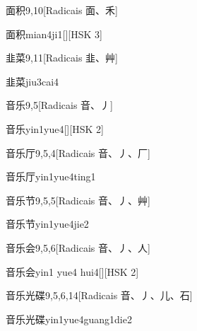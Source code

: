 \begin{entry}{面积}{9,10}[Radicais ⾯、⽲]
  \begin{phonetics}{面积}{mian4ji1}[][HSK 3]
  \end{phonetics}
\end{entry}

\begin{entry}{韭菜}{9,11}[Radicais ⾲、⾋]
  \begin{phonetics}{韭菜}{jiu3cai4}
  \end{phonetics}
\end{entry}

\begin{entry}{音乐}{9,5}[Radicais ⾳、⼃]
  \begin{phonetics}{音乐}{yin1yue4}[][HSK 2]
  \end{phonetics}
\end{entry}

\begin{entry}{音乐厅}{9,5,4}[Radicais ⾳、⼃、⼚]
  \begin{phonetics}{音乐厅}{yin1yue4ting1}
  \end{phonetics}
\end{entry}

\begin{entry}{音乐节}{9,5,5}[Radicais ⾳、⼃、⾋]
  \begin{phonetics}{音乐节}{yin1yue4jie2}
  \end{phonetics}
\end{entry}

\begin{entry}{音乐会}{9,5,6}[Radicais ⾳、⼃、⼈]
  \begin{phonetics}{音乐会}{yin1 yue4 hui4}[][HSK 2]
  \end{phonetics}
\end{entry}

\begin{entry}{音乐光碟}{9,5,6,14}[Radicais ⾳、⼃、⼉、⽯]
  \begin{phonetics}{音乐光碟}{yin1yue4guang1die2}
  \end{phonetics}
\end{entry}

